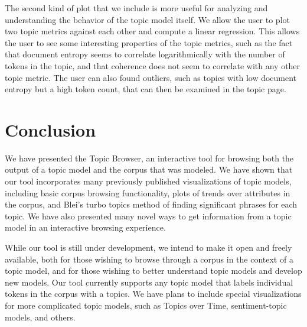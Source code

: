 \documentclass{article}
\begin{document}
The second kind of plot that we include is more useful for analyzing and
understanding the behavior of the topic model itself.  We allow the user to
plot two topic metrics against each other and compute a linear regression.
This allows the user to see some interesting properties of the topic metrics,
such as the fact that document entropy seems to correlate logarithmically with
the number of tokens in the topic, and that coherence does not seem to
correlate with any other topic metric.  The user can also found outliers, such
as topics with low document entropy but a high token count, that can then be
examined in the topic page.

\section{Conclusion}

We have presented the Topic Browser, an interactive tool for browsing both the
output of a topic model and the corpus that was modeled.  We have shown that
our tool incorporates many previously published visualizations of topic models,
including basic corpus browsing functionality, plots of trends over attributes
in the corpus, and Blei's turbo topics method of finding significant phrases
for each topic.  We have also presented many novel ways to get information from
a topic model in an interactive browsing experience.

While our tool is still under development, we intend to make it open and freely
available, both for those wishing to browse through a corpus in the context of
a topic model, and for those wishing to better understand topic models and
develop new models.  Our tool currently supports any topic model that labels
individual tokens in the corpus with a topics.  We have plans to include
special visualizations for more complicated topic models, such as Topics over
Time, sentiment-topic models, and others.



\end{document}
